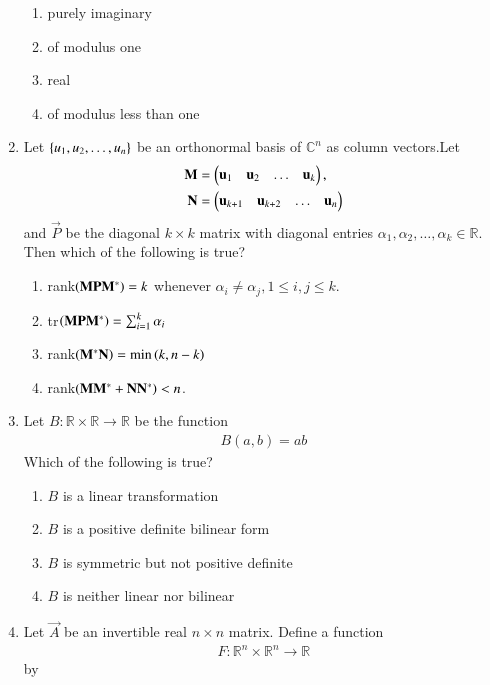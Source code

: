 \begin{enumerate}[label=\thesection.\arabic*.,ref=\thesection.\theenumi]
\begin{enumerate}
\item purely imaginary
\item of modulus one
\item real
\item of modulus less than one
\end{enumerate}  
%
\item Let $\left\{u_1,u_2,\dots, u_n\right\}$ be an orthonormal basis of $\mathbb{C}^n$ as column vectors.Let 
\begin{align}
\mathbf{M} &= \begin{pmatrix}\mathbf{u}_1 & \mathbf{u}_2 & \dots & \mathbf{u}_k\end{pmatrix},
\\
\mathbf{N} &= \begin{pmatrix}\mathbf{u}_{k+1} & \mathbf{u}_{k+2} & \dots & \mathbf{u}_n\end{pmatrix}
\end{align}
%
and $\vec{P}$ be the diagonal $k \times k$ matrix with diagonal entries $\alpha_1,\alpha_2, \dots, \alpha_k \in \mathbb{R}$.  Then which of the following is true?
\begin{enumerate}
\item rank$\left(\mathbf{M}\mathbf{P}\mathbf{M}^*\right) = k$ whenever $\alpha_i \ne \alpha_j, 1 \le i, j \le k$.
\item tr$\left(\mathbf{M}\mathbf{P}\mathbf{M}^*\right) = \sum_{i=1}^{k}\alpha_i$
\item rank$\left(\mathbf{M}^*\mathbf{N}\right) = \min\left(k,n-k\right)$
\item rank$\left(\mathbf{M}\mathbf{M}^*+\mathbf{N}\mathbf{N}^*\right)  < n$.
\end{enumerate}  
%
\solution

\item Let $B: \mathbb{R} \times \mathbb{R} \to \mathbb{R}$ be the function
\begin{align}
B(a,b) = ab
\end{align}
Which of the following is true?
\begin{enumerate}
\item $B$ is a linear transformation
\item $B$ is a positive definite bilinear form
\item $B$ is symmetric but not positive definite
\item $B$ is neither linear nor bilinear
\end{enumerate}  
%
\item Let $\vec{A}$ be an invertible real $n \times n$ matrix.  Define a function
\begin{align}
F: \mathbb{R}^n \times \mathbb{R}^n \to \mathbb{R}
\end{align}
by 
\begin{align}

\end{align}
\end{enumerate}
